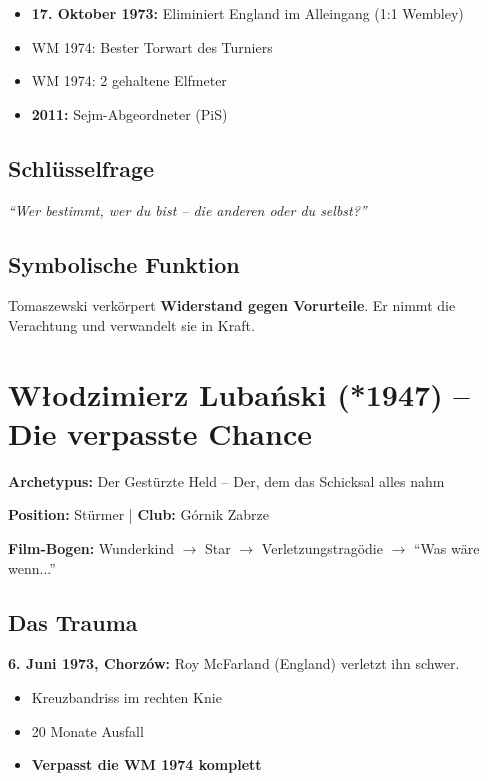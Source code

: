 \documentclass[11pt,a4paper]{book}
\newenvironment{filminfo}{%
  \begin{mdframed}[
    linecolor=darkgray,
    linewidth=1pt,
    backgroundcolor=gray!5,
    innertopmargin=10pt,
    innerbottommargin=10pt
  ]
}{%
  \end{mdframed}
}
\newenvironment{kontextbox}{%
  \begin{mdframed}[
    linecolor=polishred,
    linewidth=1pt,
    backgroundcolor=white,
    leftmargin=20pt,
    rightmargin=20pt
  ]
}{%
  \end{mdframed}
}
\begin{document}
\begin{itemize}
    \item \textbf{17. Oktober 1973:} Eliminiert England im Alleingang (1:1 Wembley)
    \item WM 1974: Bester Torwart des Turniers
    \item WM 1974: 2 gehaltene Elfmeter
    \item \textbf{2011:} Sejm-Abgeordneter (PiS)
\end{itemize}

\subsection{Schlüsselfrage}

\begin{kontextbox}
\textit{``Wer bestimmt, wer du bist -- die anderen oder du selbst?''}
\end{kontextbox}

\subsection{Symbolische Funktion}

Tomaszewski verkörpert \textbf{Widerstand gegen Vorurteile}. Er nimmt die Verachtung und verwandelt sie in Kraft.


\section{Włodzimierz Lubański (*1947) -- Die verpasste Chance}

\begin{filminfo}
\textbf{Archetypus:} Der Gestürzte Held -- Der, dem das Schicksal alles nahm

\textbf{Position:} Stürmer | \textbf{Club:} Górnik Zabrze

\textbf{Film-Bogen:} Wunderkind $\rightarrow$ Star $\rightarrow$ Verletzungstragödie $\rightarrow$ ``Was wäre wenn...''
\end{filminfo}

\subsection{Das Trauma}

\textbf{6. Juni 1973, Chorzów:} Roy McFarland (England) verletzt ihn schwer.
\begin{itemize}
    \item Kreuzbandriss im rechten Knie
    \item 20 Monate Ausfall
    \item \textbf{Verpasst die WM 1974 komplett}
\end{itemize}
\end{document}
